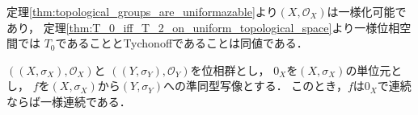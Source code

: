 	\begin{sketch}
		定理\ref{thm:topological_groups_are_uniformazable}より$\left(X,\mathscr{O}_X\right)$は一様化可能であり，
		定理\ref{thm:T_0_iff_T_2_on_uniform_topological_space}より一様位相空間では
		$T_0$であることとTychonoffであることは同値である．
		\QED
	\end{sketch}
	
	\begin{comment}
	\begin{screen}
		\begin{dfn}[不変位相]
			$\left(X,\mathscr{O}_X\right)$を群とし，$\mathscr{O}_X$を$X$上の位相とする．このとき，
			$X$の任意の部分集合$u$と$X$の任意の要素$x$に対して
			\begin{align}
				u \in \mathscr{O}_X \Longleftrightarrow
				\Set{\sigma_X(x,y)}{y \in u} \in \mathscr{O}_X
			\end{align}
			が成り立つとき，$\mathscr{O}_X$は$\sigma_X$に関して{\bf 左不変である}\index{ひだりふへん@左不変}{\bf (left invariant)}という．
			位相群の位相はその算法に関して左不変である．
		\end{dfn}
	\end{screen}
	\end{comment}
	
	\begin{screen}
		\begin{thm}[ゼロで連続な準同型は一様連続である]
			$\left(\left(X,\sigma_X\right),\mathscr{O}_X\right)$と
			$\left(\left(Y,\sigma_Y\right),\mathscr{O}_Y\right)$を位相群とし，
			$0_X$を$\left(X,\sigma_X\right)$の単位元とし，
			$f$を$\left(X,\sigma_X\right)$から$\left(Y,\sigma_Y\right)$への準同型写像とする．
			このとき，$f$は$0_X$で連続ならば一様連続である．
		\end{thm}
	\end{screen}